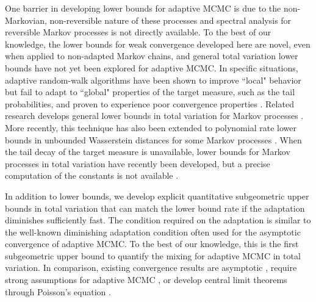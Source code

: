 \documentclass[12pt]{article}
\theoremstyle{plain}
\theoremstyle{remark}
\begin{document}
One barrier in developing lower bounds for adaptive MCMC is due to the non-Markovian, non-reversible nature of these processes and spectral analysis for reversible Markov processes is not directly available.
To the best of our knowledge, the lower bounds for weak convergence developed here are novel, even when applied to non-adapted Markov chains, and general total variation lower bounds have not yet been explored for adaptive MCMC.
In specific situations, adaptive random-walk algorithms have been shown to improve ``local" behavior but fail to adapt to ``global" properties of the target measure, such as the tail probabilities, and proven to experience poor convergence properties \citep{schmidler:woodard:2011}.
Related research develops general lower bounds in total variation for Markov processes \citep[Theorem 3.6, Corollary 3.7]{hairer:2009}.
More recently, this technique has also been extended to polynomial rate lower bounds in unbounded Wasserstein distances for some Markov processes \citep[Theorem 1.2]{sandric:etal:2022}.
When the tail decay of the target measure is unavailable, lower bounds for Markov processes in total variation have recently been developed, but a precise computation of the constants is not available \citep{bresar:etal:2024}.

In addition to lower bounds, we develop explicit quantitative subgeometric upper bounds in total variation that can match the lower bound rate if the adaptation diminishes sufficiently fast.
The condition required on the adaptation is similar to the well-known diminishing adaptation condition \citep{roberts:rosenthal:2007} often used for the asymptotic convergence of adaptive MCMC.
To the best of our knowledge, this is the first subgeometric upper bound to quantify the mixing for adaptive MCMC in total variation. 
In comparison, existing convergence results are asymptotic \citep{yves:fort:2010}, require strong assumptions for adaptive MCMC \citep{andrieu:atach2007, andrieu:moulines:2006}, or develop central limit theorems through Poisson's equation \citep{laitinen:vihola:2024}.
\end{document}

